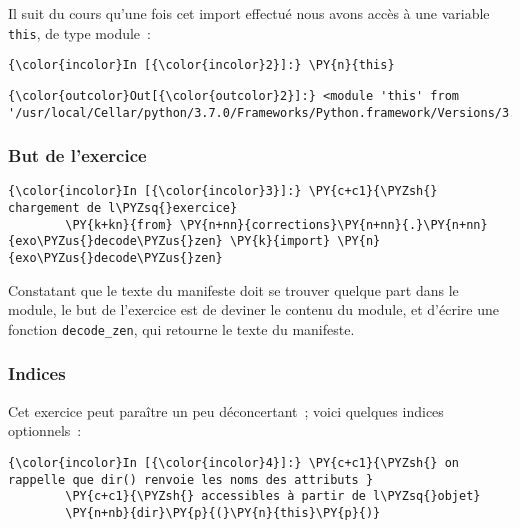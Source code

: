     Il suit du cours qu'une fois cet import effectué nous avons accès à une
variable \texttt{this}, de type module~:

    \begin{Verbatim}[commandchars=\\\{\}]
{\color{incolor}In [{\color{incolor}2}]:} \PY{n}{this}
\end{Verbatim}


\begin{Verbatim}[commandchars=\\\{\}]
{\color{outcolor}Out[{\color{outcolor}2}]:} <module 'this' from '/usr/local/Cellar/python/3.7.0/Frameworks/Python.framework/Versions/3.7/lib/python3.7/this.py'>
\end{Verbatim}
            
    \hypertarget{but-de-lexercice}{%
\subsubsection{But de l'exercice}\label{but-de-lexercice}}

    \begin{Verbatim}[commandchars=\\\{\}]
{\color{incolor}In [{\color{incolor}3}]:} \PY{c+c1}{\PYZsh{} chargement de l\PYZsq{}exercice}
        \PY{k+kn}{from} \PY{n+nn}{corrections}\PY{n+nn}{.}\PY{n+nn}{exo\PYZus{}decode\PYZus{}zen} \PY{k}{import} \PY{n}{exo\PYZus{}decode\PYZus{}zen}
\end{Verbatim}


    Constatant que le texte du manifeste doit se trouver quelque part dans
le module, le but de l'exercice est de deviner le contenu du module, et
d'écrire une fonction \texttt{decode\_zen}, qui retourne le texte du
manifeste.

    \hypertarget{indices}{%
\subsubsection{Indices}\label{indices}}

    Cet exercice peut paraître un peu déconcertant~; voici quelques indices
optionnels~:

    \begin{Verbatim}[commandchars=\\\{\}]
{\color{incolor}In [{\color{incolor}4}]:} \PY{c+c1}{\PYZsh{} on rappelle que dir() renvoie les noms des attributs }
        \PY{c+c1}{\PYZsh{} accessibles à partir de l\PYZsq{}objet}
        \PY{n+nb}{dir}\PY{p}{(}\PY{n}{this}\PY{p}{)}
\end{Verbatim}


